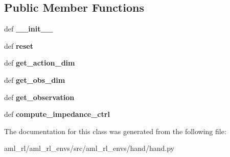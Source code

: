 \subsection*{Public Member Functions}
\begin{DoxyCompactItemize}
\item 
\hypertarget{classaml__rl__envs_1_1hand_1_1hand_1_1_hand_a364850db2d754ab884d7b65e66c6eddc}{def {\bfseries \-\_\-\-\_\-init\-\_\-\-\_\-}}\label{classaml__rl__envs_1_1hand_1_1hand_1_1_hand_a364850db2d754ab884d7b65e66c6eddc}

\item 
\hypertarget{classaml__rl__envs_1_1hand_1_1hand_1_1_hand_a699e732e7898947c24eae6074cea1c6e}{def {\bfseries reset}}\label{classaml__rl__envs_1_1hand_1_1hand_1_1_hand_a699e732e7898947c24eae6074cea1c6e}

\item 
\hypertarget{classaml__rl__envs_1_1hand_1_1hand_1_1_hand_a73256ec559622e0f2fe10dd7291139eb}{def {\bfseries get\-\_\-action\-\_\-dim}}\label{classaml__rl__envs_1_1hand_1_1hand_1_1_hand_a73256ec559622e0f2fe10dd7291139eb}

\item 
\hypertarget{classaml__rl__envs_1_1hand_1_1hand_1_1_hand_a2075387d9912a130fdccd6ea33169c73}{def {\bfseries get\-\_\-obs\-\_\-dim}}\label{classaml__rl__envs_1_1hand_1_1hand_1_1_hand_a2075387d9912a130fdccd6ea33169c73}

\item 
\hypertarget{classaml__rl__envs_1_1hand_1_1hand_1_1_hand_aa1a93bee3eb487504d7e19a90e8e2955}{def {\bfseries get\-\_\-observation}}\label{classaml__rl__envs_1_1hand_1_1hand_1_1_hand_aa1a93bee3eb487504d7e19a90e8e2955}

\item 
\hypertarget{classaml__rl__envs_1_1hand_1_1hand_1_1_hand_aca33714703be0a0964e65f1a14a26f1d}{def {\bfseries compute\-\_\-impedance\-\_\-ctrl}}\label{classaml__rl__envs_1_1hand_1_1hand_1_1_hand_aca33714703be0a0964e65f1a14a26f1d}

\end{DoxyCompactItemize}


The documentation for this class was generated from the following file\-:\begin{DoxyCompactItemize}
\item 
aml\-\_\-rl/aml\-\_\-rl\-\_\-envs/src/aml\-\_\-rl\-\_\-envs/hand/hand.\-py\end{DoxyCompactItemize}
